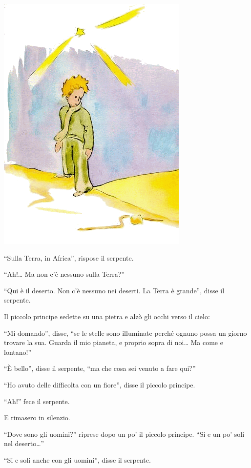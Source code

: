 \documentclass[11pt]{scrbook}
\begin{document}
\begin{center}
\includegraphics{img/17a}
\end{center}

``Sulla Terra, in Africa'', rispose il serpente.

``Ah!\ldots{} Ma non c'è nessuno sulla Terra?''

``Qui è il deserto. Non c'è nessuno nei deserti. La Terra è grande'',
disse il serpente.

Il piccolo principe sedette su una pietra e alzò gli occhi verso il
cielo:

``Mi domando'', disse, ``se le stelle sono illuminate perché ognuno
possa un giorno trovare la sua. Guarda il mio pianeta, e proprio sopra
di noi\ldots{} Ma come e lontano!''

``È bello'', disse il serpente, ``ma che cosa sei venuto a fare qui?''

``Ho avuto delle difficolta con un fiore'', disse il piccolo principe.

``Ah!'' fece il serpente.

E rimasero in silenzio.

``Dove sono gli uomini?'' riprese dopo un po' il piccolo principe. ``Si
e un po' soli nel deserto\ldots{}''

``Si e soli anche con gli uomini'', disse il serpente.
\end{document}
